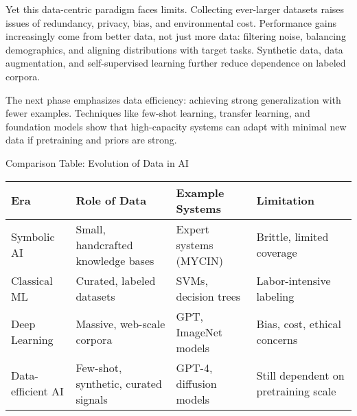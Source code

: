 \documentclass[
  letterpaper,
  DIV=11,
  numbers=noendperiod]{scrreprt}
\begin{document}
Yet this data-centric paradigm faces limits. Collecting ever-larger
datasets raises issues of redundancy, privacy, bias, and environmental
cost. Performance gains increasingly come from better data, not just
more data: filtering noise, balancing demographics, and aligning
distributions with target tasks. Synthetic data, data augmentation, and
self-supervised learning further reduce dependence on labeled corpora.

The next phase emphasizes data efficiency: achieving strong
generalization with fewer examples. Techniques like few-shot learning,
transfer learning, and foundation models show that high-capacity systems
can adapt with minimal new data if pretraining and priors are strong.

Comparison Table: Evolution of Data in AI

\begin{longtable}[]{@{}
  >{\raggedright\arraybackslash}p{}
  >{\raggedright\arraybackslash}p{}
  >{\raggedright\arraybackslash}p{}
  >{\raggedright\arraybackslash}p{}@{}}
\toprule\noalign{}
\begin{minipage}[b]{\linewidth}\raggedright
Era
\end{minipage} & \begin{minipage}[b]{\linewidth}\raggedright
Role of Data
\end{minipage} & \begin{minipage}[b]{\linewidth}\raggedright
Example Systems
\end{minipage} & \begin{minipage}[b]{\linewidth}\raggedright
Limitation
\end{minipage} \\
\midrule\noalign{}
\endhead
\bottomrule\noalign{}
\endlastfoot
Symbolic AI & Small, handcrafted knowledge bases & Expert systems
(MYCIN) & Brittle, limited coverage \\
Classical ML & Curated, labeled datasets & SVMs, decision trees &
Labor-intensive labeling \\
Deep Learning & Massive, web-scale corpora & GPT, ImageNet models &
Bias, cost, ethical concerns \\
Data-efficient AI & Few-shot, synthetic, curated signals & GPT-4,
diffusion models & Still dependent on pretraining scale \\
\end{longtable}
\end{document}
